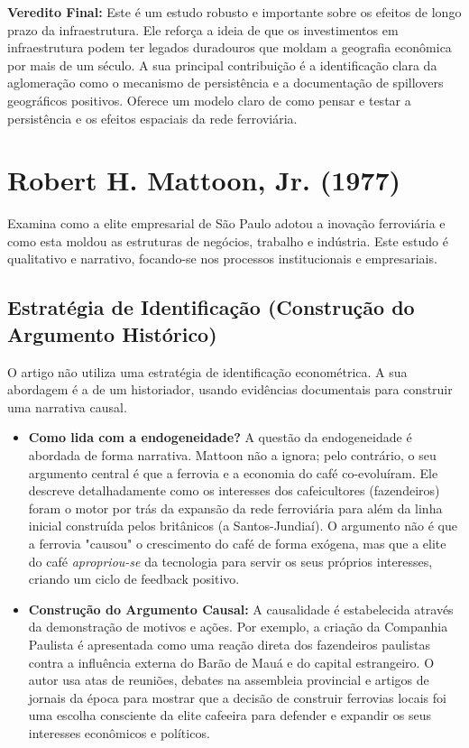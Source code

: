 \documentclass[12pt, a4paper]{article}
\begin{document}
\noindent\textbf{Veredito Final:} Este é um estudo robusto e importante sobre os efeitos de longo prazo da infraestrutura. Ele reforça a ideia de que os investimentos em infraestrutura podem ter legados duradouros que moldam a geografia econômica por mais de um século. A sua principal contribuição é a identificação clara da aglomeração como o mecanismo de persistência e a documentação de spillovers geográficos positivos. Oferece um modelo claro de como pensar e testar a persistência e os efeitos espaciais da rede ferroviária.

\section{Robert H. Mattoon, Jr. (1977)}
Examina como a elite empresarial de São Paulo adotou a inovação ferroviária e como esta moldou as estruturas de negócios, trabalho e indústria. Este estudo é qualitativo e narrativo, focando-se nos processos institucionais e empresariais.

\subsection{Estratégia de Identificação (Construção do Argumento Histórico)}
O artigo não utiliza uma estratégia de identificação econométrica. A sua abordagem é a de um historiador, usando evidências documentais para construir uma narrativa causal.

\begin{itemize}
    \item \textbf{Como lida com a endogeneidade?} A questão da endogeneidade é abordada de forma narrativa. Mattoon não a ignora; pelo contrário, o seu argumento central é que a ferrovia e a economia do café co-evoluíram. Ele descreve detalhadamente como os interesses dos cafeicultores (fazendeiros) foram o motor por trás da expansão da rede ferroviária para além da linha inicial construída pelos britânicos (a Santos-Jundiaí). O argumento não é que a ferrovia "causou" o crescimento do café de forma exógena, mas que a elite do café \textit{apropriou-se} da tecnologia para servir os seus próprios interesses, criando um ciclo de feedback positivo.

    \item \textbf{Construção do Argumento Causal:} A causalidade é estabelecida através da demonstração de motivos e ações. Por exemplo, a criação da Companhia Paulista é apresentada como uma reação direta dos fazendeiros paulistas contra a influência externa do Barão de Mauá e do capital estrangeiro. O autor usa atas de reuniões, debates na assembleia provincial e artigos de jornais da época para mostrar que a decisão de construir ferrovias locais foi uma escolha consciente da elite cafeeira para defender e expandir os seus interesses econômicos e políticos.
\end{itemize}
\end{document}
